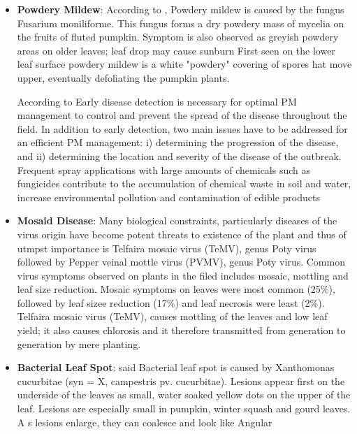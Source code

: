 \begin{itemize}
	
	\item {\bfseries Powdery Mildew}: According to \citep{oparaOVERVIEWMANAGEMENTDISEASE2019}, Powdery mildew is caused by the fungus Fusarium moniliforme. This fungus forms a dry powdery mass of mycelia on the fruits of fluted pumpkin. Symptom is also observed as greyish powdery areas on older leaves; leaf drop may cause sunburn First seen on the lower leaf surface powdery mildew is a white "powdery" covering of spores hat move upper, eventually defoliating the pumpkin plants.
	
	According to \citep{abdulridhaDetectingPowderyMildew2020}
	Early disease detection is necessary for optimal PM management to control and prevent the spread of the disease throughout the field. In addition to early detection, two main issues have to be addressed for an efficient PM management: i) determining the progression of the disease, and ii) determining the location and severity of the disease of the outbreak. Frequent spray applications with large amounts of chemicals such as fungicides contribute to the accumulation of chemical waste in soil and water, increase environmental pollution and contamination of edible products 
	
	\item {\bfseries Mosaid Disease}: Many biological constraints, particularly diseases of the virus origin have become potent threats to existence of the plant and thus of utmpst importance is Telfaira mosaic virus (TeMV), genus Poty virus followed by Pepper veinal mottle virus (PVMV), genus Poty virus. Common virus symptoms observed on plants in the filed includes mosaic, mottling and leaf size reduction. Mosaic symptoms on leaves  were most common (25\%), followed by leaf sizee reduction (17\%) and leaf necrosis were least (2\%). Telfaira mosaic virus (TeMV), causes mottling of the leaves and low leaf yield; it also causes chlorosis and it therefore transmitted from generation to generation by mere planting.\citep{oparaOVERVIEWMANAGEMENTDISEASE2019}
	
	\item {\bfseries Bacterial Leaf Spot}: \citep{oparaOVERVIEWMANAGEMENTDISEASE2019} said Bacterial leaf spot is caused by Xanthomonas cucurbitae (syn = X, campestris pv. cucurbitae). Lesions appear first on the underside of the leaves as small, water soaked yellow dots on the upper of the leaf. Lesions are especially small in pumpkin, winter squash and gourd leaves. A s lesions enlarge, they can coalesce and look like Angular
\end{itemize}

